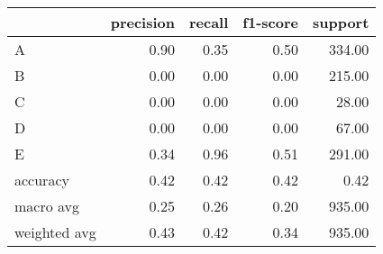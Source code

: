 \begin{tabular}{|l|r|r|r|r|}
\hline
{} &  precision &  recall &  f1-score &  support \\
\hline
A            &       0.90 &    0.35 &      0.50 &   334.00 \\
B            &       0.00 &    0.00 &      0.00 &   215.00 \\
C            &       0.00 &    0.00 &      0.00 &    28.00 \\
D            &       0.00 &    0.00 &      0.00 &    67.00 \\
E            &       0.34 &    0.96 &      0.51 &   291.00 \\
accuracy     &       0.42 &    0.42 &      0.42 &     0.42 \\
macro avg    &       0.25 &    0.26 &      0.20 &   935.00 \\
weighted avg &       0.43 &    0.42 &      0.34 &   935.00 \\
\hline
\end{tabular}
